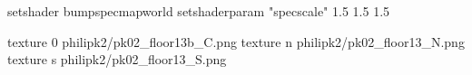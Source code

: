 setshader bumpspecmapworld
setshaderparam "specscale" 1.5 1.5 1.5

texture 0 philipk2/pk02_floor13b_C.png
texture n philipk2/pk02_floor13_N.png
texture s philipk2/pk02_floor13_S.png

